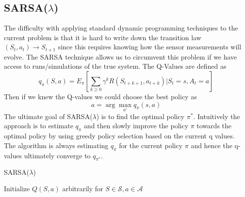 \documentclass{article}
\begin{document}
\subsection{SARSA($\lambda$)}
\label{discrete_sarsa}
The difficulty with applying standard dynamic programming techniques to the current problem is that it is hard to write down the transition law $(S_t,a_t) \to S_{t+1}$ since this requires knowing how the sensor measurements will evolve. The SARSA technique allows us to circumvent this problem if we have access to runs/simulations of the true system. The Q-Values are defined as 
%
%
\begin{equation}
q_{\pi}(S,a) = E_{\pi} \left[ \sum_{k \geq 0} \gamma^k R(S_{t+k+1}, a_{t+k}) | S_t = s, A_t = a \right]
\end{equation}
%
%
Then if we knew the Q-values we could choose the best policy as 
%
\begin{equation}
\label{q-policy}
a = \arg \max_{a'} q_{\pi}(s,a) 
\end{equation}
%
The ultimate goal of SARSA($\lambda$) is to find the optimal policy $\pi^*$. Intuitively the approach is to estimate $q_{\pi}$ and then slowly improve the policy $\pi$ towards the optimal policy by using greedy policy selection based on the current q values. The algorithm is always estimating $q_{\pi}$ for the current policy $\pi$ and hence the q-values ultimately converge to $q_{\pi^*}$.

\begin{algorithm}[H]
   \caption{SARSA($\lambda$)}
   \label{alg:SARSA}
\begin{algorithmic}
   \STATE Initialize $Q(S,a)$ arbitrarily for $S \in \mathcal{S}, a \in \mathcal{A}$
   \REPEAT

\end{algorithmic}
\end{algorithm}
\end{document}
